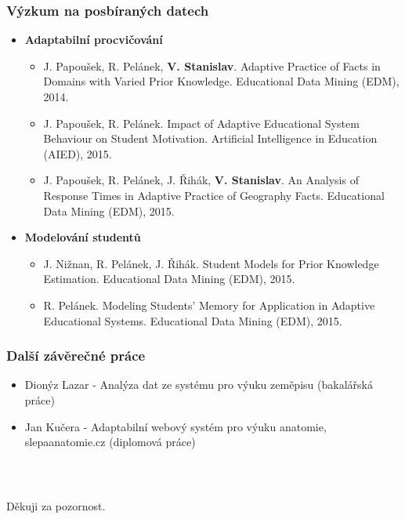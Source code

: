 \documentclass[xcolor=svgnames]{beamer}
\begin{document}
\begin{frame}
	\frametitle{Výzkum na posbíraných datech}

  \begin{itemize}
   \item \textbf{Adaptabilní procvičování}

  \begin{itemize}
   \item J. Papoušek, R. Pelánek, \textbf{V. Stanislav}. Adaptive Practice of Facts in Domains with Varied Prior Knowledge. Educational Data Mining (EDM), 2014.
   \item J. Papoušek, R. Pelánek. Impact of Adaptive Educational System Behaviour on Student Motivation. Artificial Intelligence in Education (AIED), 2015.
   \item J. Papoušek, R. Pelánek, J. Řihák, \textbf{V. Stanislav}. An Analysis of Response Times in Adaptive Practice of Geography Facts. Educational Data Mining (EDM), 2015.
  \end{itemize}

   \item \textbf{Modelování studentů }

  \begin{itemize}
   \item J. Nižnan, R. Pelánek, J. Řihák. Student Models for Prior Knowledge Estimation. Educational Data Mining (EDM), 2015.
   \item R. Pelánek. Modeling Students' Memory for Application in Adaptive Educational Systems. Educational Data Mining (EDM), 2015.
  \end{itemize}
  \end{itemize}

\end{frame}
\begin{frame}
	\frametitle{Další závěrečné práce}
  \begin{itemize}
  \item Dionýz Lazar - Analýza dat ze systému pro výuku zeměpisu (bakalářská práce)
  \item Jan Kučera - Adaptabilní webový systém pro výuku anatomie, slepaanatomie.cz (diplomová práce)
  \end{itemize}
\end{frame}
\begin{frame}
  \frametitle{~}
\begin{center} 
\huge  Děkuji za pozornost.
\end{center}
\end{frame}
\end{document}
